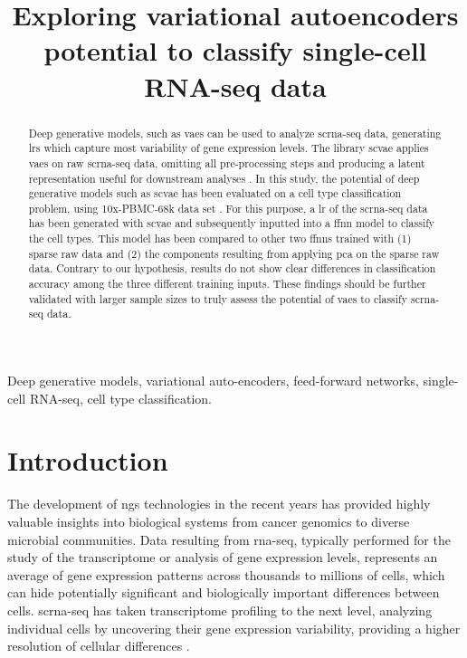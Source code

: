 \documentclass{article}
\title{\Large{Exploring variational autoencoders potential to classify single-cell RNA-seq data}}
\begin{document}
\maketitle
\begin{abstract}
Deep generative models, such as \glspl{vae} can be used to analyze \gls{scrna-seq} data, generating \glspl{lr} which capture most variability of gene expression levels.
The library \gls{scvae} applies \glspl{vae} on raw \gls{scrna-seq} data, omitting all pre-processing steps and producing a latent representation useful for downstream analyses \cite{gronbech2020}.
In this study, the potential of deep generative models such as \gls{scvae} has been evaluated on a cell type classification problem, using 10x-PBMC-68k data set \cite{zheng2017a}. 
For this purpose, a \gls{lr} of the \gls{scrna-seq} data has been generated with \gls{scvae} and subsequently inputted into a \gls{ffnn} model to classify the cell types.
This model has been compared to other two \glspl{ffnn}
trained with (1) sparse raw data and (2) the components resulting from applying \gls{pca} on the sparse raw data.
Contrary to our hypothesis, results do not show clear differences in classification accuracy among the three different training inputs.
These findings should be further validated with larger sample sizes to truly assess the potential of \glspl{vae} to classify \gls{scrna-seq} data.
\end{abstract}
%
\begin{keywords}
Deep generative models, variational auto-encoders, feed-forward networks, single-cell RNA-seq, cell type classification.
\end{keywords}
%
\section{Introduction}
\label{sec:intro}
The development of \gls{ngs} technologies in the recent years has provided highly valuable insights into biological systems from cancer genomics to diverse microbial communities.
Data resulting from \gls{rna-seq}, typically performed for the study of the transcriptome or analysis of gene expression levels, represents an average of gene expression patterns across thousands to millions of cells, which can hide potentially significant and biologically important differences between cells. 
\gls{scrna-seq} has taken transcriptome profiling to the next level, analyzing individual cells by uncovering their gene expression variability, providing a higher resolution of cellular differences \cite{Olsen2018}. \\ 
\end{document}
